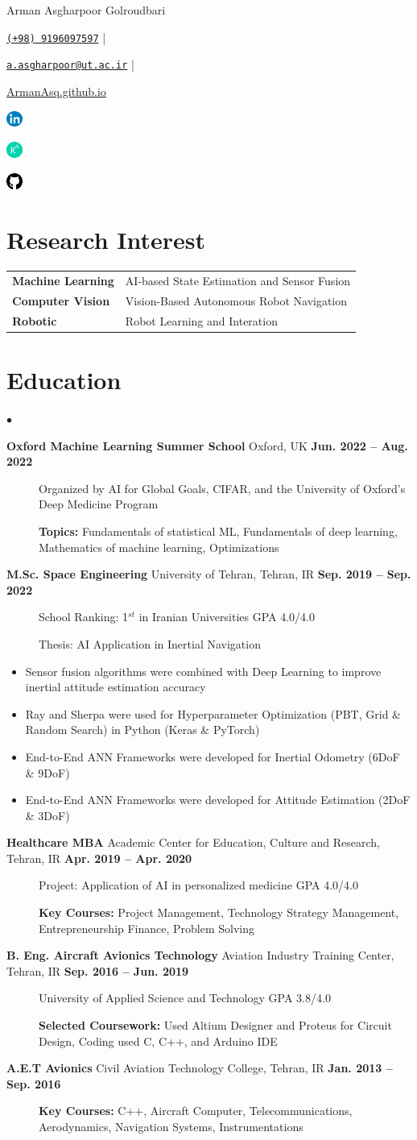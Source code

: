 \documentclass[a4,25pt]{article}
\newenvironment{researchinterest}
{\section*{Research Interest}
\vspace{-0.2cm}
\hspace{0.5cm}\begin{tabular}{>{}p{0.2\textwidth} p{0.7\textwidth}}}
{\end{tabular}}
\newenvironment{education}{
    
    \begin{list}{$\bullet$}{\leftmargin=1cm}
}{\end{list}}
\newcommand{\edu}[3]{
    \vspace{-0.2cm}
    \item{\textbf{#1} #2 \hfill\textbf{#3}} \vspace{-2pt}
}
\newcommand{\edudetail}[2]{
    \vspace{-0.4cm}
    \begin{description}
        \item[] #1 {#2} \vspace{-1.5pt}
    \end{description}
}
\newcommand{\edudetailitemize}[1]{
    \vspace{-0.4cm}
    \begin{itemize}
        \item #1 \vspace{-3pt}
    \end{itemize}
}
\newenvironment{personaldetail}{
\begin{center}   
}{\end{center}}
\newcommand{\name}[1]{
    {\huge #1}\\ \vspace{0.15cm}
}
\newcommand{\phone}[2]{
    \texttt{\href{callto:#1#2}{(#1) #2}} \hspace{5 pt}| 
}
\newcommand{\email}[1]{
    \texttt{\href{mailto:#1}{#1}} \hspace{5 pt}| 
}
\newcommand{\website}[1]{
    \href{#1}{#1} \\ \vspace{0.25cm}
}
\newcommand{\github}[1]{
    \href{https://www.github.com/#1}{\includegraphics[width=15pt]{github.png}}
}
\newcommand{\researchgate}[1]{
    \href{https://researchgate.net/profile/#1}
    {\includegraphics[width=15pt]{rg.png}}
}
\newcommand{\linkedin}[1]{
    \href{https://linkedin.com/in/#1}
    {\includegraphics[width=15pt]{linkedin.png}}
\vspace{-0.35cm} }
\begin{document}
    \begin{personaldetail}
    \name{Arman Asgharpoor Golroudbari}
    \phone{+98}{9196097597}
    \email{a.asgharpoor@ut.ac.ir}
    \website{ArmanAsq.github.io}
    \linkedin{asgharpoor}
    \researchgate{Arman_Asgharpoor}
    \github{armanasq}
\end{personaldetail}

\begin{researchinterest}
    \textbf{Machine Learning} & {{AI-based State Estimation and Sensor Fusion}} \\
    \textbf{Computer Vision} & {Vision-Based Autonomous Robot Navigation } \\
    \textbf{Robotic} & Robot Learning and Interation
\end{researchinterest}

\section*{Education}
\begin{education}
    \edu{Oxford Machine Learning Summer School}{Oxford, UK }{Jun. 2022 – Aug. 2022}
    \edudetail{Organized by AI for Global Goals, CIFAR, and the University of Oxford’s Deep Medicine Program}{}
    \edudetail{\textbf{Topics: }}{Fundamentals of statistical ML, Fundamentals of deep learning, Mathematics of machine learning, Optimizations }
    \edu{M.Sc. Space Engineering}{University of Tehran, Tehran, IR}{Sep. 2019 – Sep. 2022}
    \edudetail{School Ranking: 1$^{st}$ in Iranian Universities}{\hfill GPA 4.0/4.0}
    \edudetail{Thesis: } {AI Application in Inertial Navigation}
    \edudetailitemize {Sensor fusion algorithms were combined with Deep Learning to improve inertial attitude estimation accuracy}
    \edudetailitemize {Ray and Sherpa were used for Hyperparameter Optimization (PBT, Grid \& Random Search) in Python (Keras \& PyTorch)}
    \edudetailitemize {End-to-End ANN Frameworks were developed for Inertial Odometry (6DoF \& 9DoF)}
    \edudetailitemize {End-to-End ANN Frameworks were developed for Attitude Estimation (2DoF \& 3DoF)}

    \edu{Healthcare MBA}{Academic Center for Education, Culture and Research, Tehran, IR}{Apr. 2019 – Apr. 2020}
    \edudetail{Project: Application of AI in personalized medicine}{\hfill{GPA 4.0/4.0}}
    \edudetail{\textbf{Key Courses: }} {Project Management, Technology Strategy Management, Entrepreneurship Finance, Problem Solving}
    \edu{B. Eng. Aircraft Avionics Technology}{Aviation Industry Training Center, Tehran, IR}{Sep. 2016 – Jun. 2019}
    \edudetail{University of Applied Science and Technology}{\hfill{GPA 3.8/4.0}}
    \edudetail{\textbf{Selected Coursework:}} {Used Altium Designer and Proteus for Circuit Design, Coding used C, C++, and Arduino IDE}
    \edu{A.E.T Avionics}{Civil Aviation Technology College, Tehran, IR}{Jan. 2013 – Sep. 2016}
    \edudetail{\textbf{Key Courses:}} {C++, Aircraft Computer, Telecommunications, Aerodynamics, Navigation Systems, Instrumentations}
\end{education}
\end{document}
